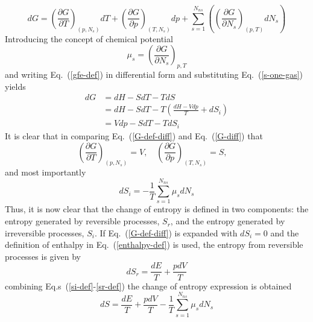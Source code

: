 \documentclass[a4paper]{report}
\newcommand{\eref}[1]{Eq.~(\ref{#1})}
\newcommand{\erefs}[2]{Eq.s~(\ref{#1}-\ref{#2})}
\begin{document}
\begin{enumerate}
\begin{equation}
      dG = \left( \frac{\partial G}{\partial T} \right)_{(p,N_s)} dT
      + \left( \frac{\partial G}{\partial p} \right)_{(T,N_s)} dp
      + \sum\limits_{s=1}^{N_{ns}}{\left( \left( \frac{\partial G}{\partial N_s}
      \right)_{(p,T)} dN_s\right)}
      \label{G-diff}
    \end{equation}
    Introducing the concept of chemical potential
    \begin{equation}
      \mu_s = \left( \frac{\partial G}{\partial N_s} \right)_{p,T}
      \label{mu-def}
    \end{equation}
    and writing \eref{gfe-def} in differential form and substituting
    \eref{s-one-gas} yields
    \begin{equation}
      \begin{aligned}
        dG &= dH - SdT - TdS \\
	&= dH - SdT - T\left( \frac{dH - Vdp}{T} + dS_i \right) \\
	&= Vdp - SdT - TdS_i
      \end{aligned}
      \label{G-def-diff}
    \end{equation}
    It is clear that in comparing \eref{G-def-diff} and \eref{G-diff} that
    \begin{equation}
      \left( \frac{\partial G}{\partial T} \right)_{(p,N_s)} = V, \quad
      \left( \frac{\partial G}{\partial p} \right)_{(T,N_s)} = S, \quad
      \label{G-derivs}
    \end{equation}
    and most importantly
    \begin{equation}
      dS_i = -\frac{1}{T}\sum\limits_{s=1}^{N_{ns}}{\mu_s dN_s}
      \label{si-def}
    \end{equation}
    Thus, it is now clear that the change of entropy is defined in two
    components: the entropy generated by reversible processes, $S_r$, and the
    entropy generated by irreversible processes, $S_i$.  If \eref{G-def-diff} is
    expanded with $dS_i = 0$ and the definition of enthalpy in
    \eref{enthalpy-def} is used, the entropy from reversible processes is given
    by
    \begin{equation}
      dS_r = \frac{dE}{T} + \frac{pdV}{T}
      \label{sr-def}
    \end{equation}
    combining \erefs{si-def}{sr-def} the change of entropy expression is
    obtained
    \begin{equation}
      \boxed{dS = \frac{dE}{T} + \frac{pdV}{T} 
      -\frac{1}{T}\sum\limits_{s=1}^{N_{ns}}{\mu_s dN_s}}
      \label{ds-final}
    \end{equation}
    

\end{enumerate}
\end{document}
